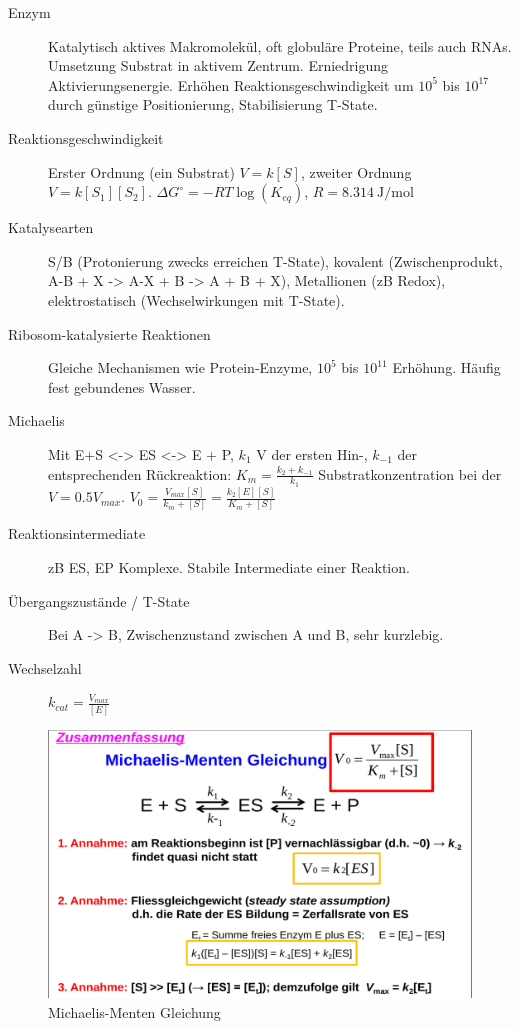 \documentclass[a4paper,twocolumn,english,fontsize=7,DIV=16]{scrartcl}
\begin{document}
\begin{description}
	\item[Enzym] Katalytisch aktives Makromolekül, oft globuläre Proteine,
		teils auch RNAs. Umsetzung Substrat in aktivem Zentrum.
		Erniedrigung Aktivierungsenergie. Erhöhen
		Reaktionsgeschwindigkeit um $10^5$ bis $10^17$ durch günstige
		Positionierung, Stabilisierung T-State.
	\item[Reaktionsgeschwindigkeit] Erster Ordnung (ein Substrat) $V =
		k[S]$, zweiter Ordnung $V = k [S_1][S_2]$. $\Delta G^\circ = -R
		T \log(K_{eq})$, $R = \SI{8.314}{\J \per \mol}$
	\item[Katalysearten] S/B (Protonierung zwecks erreichen T-State),
		kovalent (Zwischenprodukt, A-B + X -> A-X + B -> A + B + X),
		Metallionen (zB Redox), elektrostatisch (Wechselwirkungen mit
		T-State).
	\item[Ribosom-katalysierte Reaktionen] Gleiche Mechanismen wie
		Protein-Enzyme, $10^5$ bis $10^11$ Erhöhung. Häufig fest
		gebundenes Wasser.
	\item[Michaelis] Mit E+S <-> ES <-> E + P, $k_1$ V der ersten Hin-,
		$k_{-1}$ der entsprechenden Rückreaktion: $K_m = \frac{k_2 +
		k_{-1}}{k_1}$ Substratkonzentration bei der $V = 0.5 V_{max}$.
		$V_0 = \frac{V_{max} [S]}{k_m + [S]} = \frac{k_2[E][S]}{K_m +
		[S]}$
	\item[Reaktionsintermediate] zB ES, EP Komplexe. Stabile Intermediate
		einer Reaktion.
	\item[Übergangszustände / T-State] Bei A -> B, Zwischenzustand zwischen
		A und B, sehr kurzlebig.
	\item[Wechselzahl] $k_{cat} = \frac{V_{max}}{[E]}$
\end{description}

\begin{figure}
	\centering
	\includegraphics[width=\linewidth]{img/michaelis.png}
	\caption{Michaelis-Menten Gleichung}
\end{figure}
\end{document}
